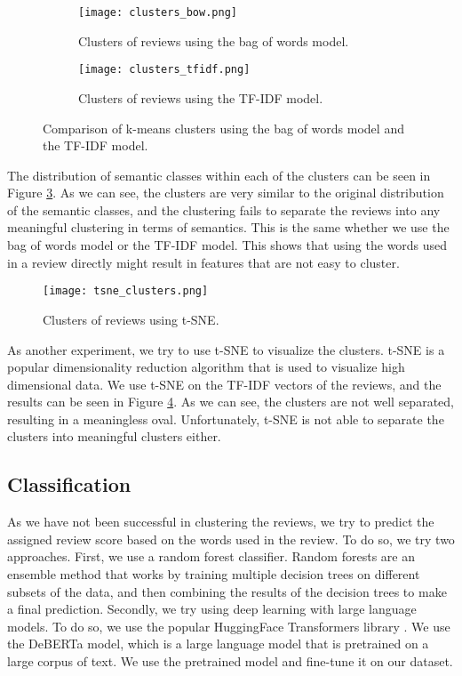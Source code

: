 \documentclass[12pt]{article}    %
\begin{document}
\begin{figure}[!ht]
    \centering
    \begin{subfigure}{0.8\textwidth}
        \texttt{[image: clusters\_bow.png]}
        \caption{Clusters of reviews using the bag of words model.}
        \label{fig:clusters_bow}
    \end{subfigure}
    \hfill
    \begin{subfigure}{0.8\textwidth}
        \texttt{[image: clusters\_tfidf.png]}
        \caption{Clusters of reviews using the TF-IDF model.}
        \label{fig:clusters_tfidf}
    \end{subfigure}
    \caption{Comparison of k-means clusters using the bag of words model and the TF-IDF model.}
    \label{fig:combined_clusters}
\end{figure}

The distribution of semantic classes within each of the clusters can be seen in Figure \ref{fig:combined_clusters}. As we can see, the clusters are very similar to the original distribution of the semantic classes, and the clustering fails to separate the reviews into any meaningful clustering in terms of semantics. This is the same whether we use the bag of words model or the TF-IDF model. This shows that using the words used in a review directly might result in features that are not easy to cluster. 

\begin{figure}
    \centering
    \texttt{[image: tsne\_clusters.png]}
    \caption{Clusters of reviews using t-SNE.}
    \label{fig:tsne_clusters}
\end{figure}

As another experiment, we try to use t-SNE to visualize the clusters. t-SNE is a popular dimensionality reduction algorithm that is used to visualize high dimensional data. We use t-SNE on the TF-IDF vectors of the reviews, and the results can be seen in Figure \ref{fig:tsne_clusters}. As we can see, the clusters are not well separated, resulting in a meaningless oval. Unfortunately, t-SNE is not able to separate the clusters into meaningful clusters either.

\subsection{Classification}

As we have not been successful in clustering the reviews, we try to predict the assigned review score based on the words used in the review. To do so, we try two approaches. First, we use a random forest classifier. Random forests are an ensemble method that works by training multiple decision trees on different subsets of the data, and then combining the results of the decision trees to make a final prediction. Secondly, we try using deep learning with large language models. To do so, we use the popular HuggingFace Transformers library \cite{huggingface}. We use the DeBERTa \cite{deberta} model, which is a large language model that is pretrained on a large corpus of text. We use the pretrained model and fine-tune it on our dataset.
\end{document}
